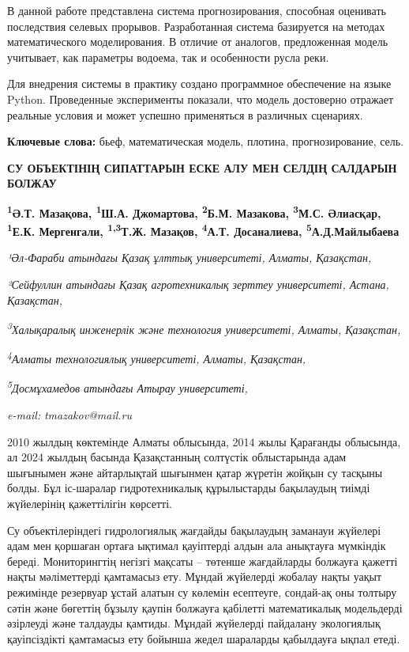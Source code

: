 В данной работе представлена система прогнозирования, способная
оценивать последствия селевых прорывов. Разработанная система базируется
на методах математического моделирования. В отличие от аналогов,
предложенная модель учитывает, как параметры водоема, так и особенности
русла реки.

Для внедрения системы в практику создано программное обеспечение на
языке Python. Проведенные эксперименты показали, что модель достоверно
отражает реальные условия и может успешно применяться в различных
сценариях.

{\bfseries Ключевые слова:} бьеф, математическая модель, плотина,
прогнозирование, сель.

\begin{articleheader}
{\bfseries СУ ОБЪЕКТІНІҢ СИПАТТАРЫН ЕСКЕ АЛУ МЕН СЕЛДІҢ САЛДАРЫН БОЛЖАУ}

{\bfseries
\textsuperscript{1}Ә.Т. Мазақова,
\textsuperscript{1}Ш.А. Джомартова,
\textsuperscript{2}Б.М. Мазакова,
\textsuperscript{3}М.С. Әлиасқар,
\textsuperscript{1}Е.К. Мергенгали,
\textsuperscript{1,3}Т.Ж. Мазақов,
\textsuperscript{4}А.Т. Досаналиева,
\textsuperscript{5}А.Д.Майлыбаева}
\end{articleheader}

\begin{affiliation}
\emph{¹Әл-Фараби атындағы Қазақ ұлттық университеті, Алматы, Қазақстан,}

\emph{²Сейфуллин атындағы Қазақ агротехникалық зерттеу университеті, Астана, Қазақстан,}

\emph{\textsuperscript{3}Халықаралық инженерлік және технология университеті, Алматы, Қазақстан,}

\emph{\textsuperscript{4}Алматы технологиялық университеті, Алматы, Қазақстан,}

\emph{\textsuperscript{5}Досмұхамедов атындағы Атырау университеті,}

\emph{e-mail:} \emph{tmazakov@mail.ru}
\end{affiliation}

2010 жылдың көктемінде Алматы облысында, 2014 жылы Қарағанды
\hspace{0pt}\hspace{0pt}облысында, ал 2024 жылдың басында Қазақстанның
солтүстік облыстарында адам шығынымен және айтарлықтай шығынмен қатар
жүретін жойқын су тасқыны болды. Бұл іс-шаралар гидротехникалық
құрылыстарды бақылаудың тиімді жүйелерінің қажеттілігін көрсетті.

Су объектілеріндегі гидрологиялық жағдайды бақылаудың заманауи жүйелері
адам мен қоршаған ортаға ықтимал қауіптерді алдын ала анықтауға
мүмкіндік береді. Мониторингтің негізгі мақсаты -- төтенше жағдайларды
болжауға қажетті нақты мәліметтерді қамтамасыз ету. Мұндай жүйелерді
жобалау нақты уақыт режимінде резервуар ұстай алатын су көлемін
есептеуге, сондай-ақ оны толтыру сәтін және бөгеттің бұзылу қаупін
болжауға қабілетті математикалық модельдерді әзірлеуді және талдауды
қамтиды. Мұндай жүйелерді пайдалану экологиялық қауіпсіздікті қамтамасыз
ету бойынша жедел шараларды қабылдауға ықпал етеді.

